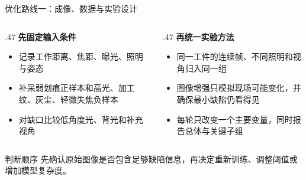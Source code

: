 \documentclass[aspectratio=169,10pt]{beamer}
\begin{document}
\begin{frame}{优化路线一：成像、数据与实验设计}
  \begin{columns}[T,onlytextwidth]
    \begin{column}{.47\textwidth}
      \textbf{先固定输入条件}
      \begin{itemize}
        \item 记录工作距离、焦距、曝光、照明与姿态
        \item 补采弱划痕正样本和高光、加工纹、灰尘、轻微失焦负样本
        \item 对缺口比较低角度光、背光和补充视角
      \end{itemize}
    \end{column}
    \begin{column}{.47\textwidth}
      \textbf{再统一实验方法}
      \begin{itemize}
        \item 同一工件的连续帧、不同照明和视角归入同一组
        \item 图像增强只模拟现场可能变化，并确保最小缺陷仍看得见
        \item 每轮只改变一个主要变量，同时报告总体与关键子组
      \end{itemize}
    \end{column}
  \end{columns}

  \vfill
  \begin{block}{判断顺序}
    先确认原始图像是否包含足够缺陷信息，再决定重新训练、调整阈值或增加模型复杂度。
  \end{block}
\end{frame}
\end{document}
